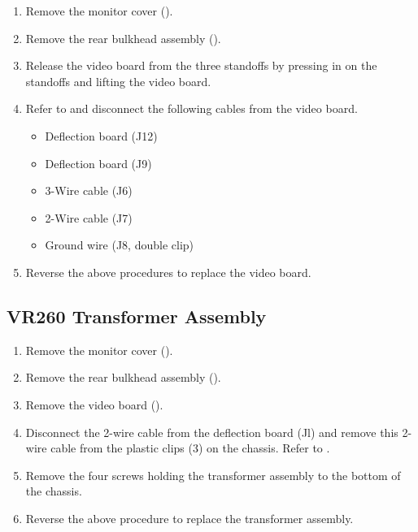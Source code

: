 \begin{enumerate}

\item	Remove the monitor cover ().
\item	Remove the rear bulkhead assembly ().
\item	Release the video board from the three standoffs by pressing in on the
		standoffs and lifting the video board.
\item	Refer to  and disconnect the following cables from the video board.
		\begin{itemize}
		\item	Deflection board (J12)
		\item	Deflection board (J9)
		\item	3-Wire cable (J6)
		\item	2-Wire cable (J7)
		\item	Ground wire (J8, double clip)
		\end{itemize}

\newpage
{}
\item	Reverse the above procedures to replace the video board.
\end{enumerate}
\subsection{VR260 Transformer Assembly}
\begin{enumerate}
\item	Remove the monitor cover ().
\item	Remove the rear bulkhead assembly ().
\item	Remove the video board ().
\newpage
\item	Disconnect the 2-wire cable from the deflection board (Jl) and remove
		this 2-wire cable from the plastic clips (3) on the chassis. Refer to .
\item	Remove the four screws holding the transformer assembly to the bottom
		of the chassis.
\item	Reverse the above procedure to replace the transformer assembly.
\end{enumerate}
\newpage

